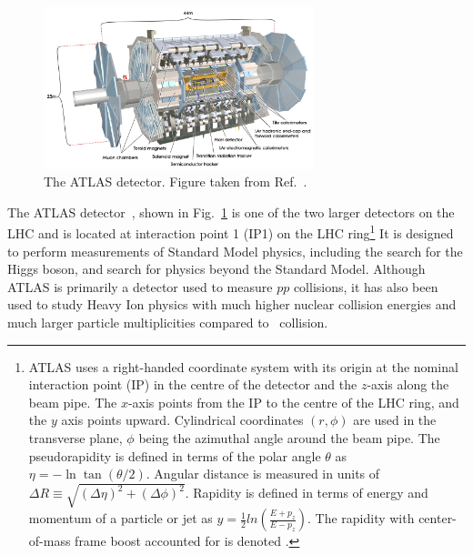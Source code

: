 \begin{figure}[ht]
	\centering
	\includegraphics[width=0.7\textwidth]{figures/atlas.pdf} %
	\caption{The ATLAS detector. Figure taken from Ref.~\cite{Aad:2008zzm}.}	
	\label{fig:atlas}%
\end{figure}

The ATLAS detector~\cite{Aad:2008zzm}, shown in Fig.~\ref{fig:atlas} is one of the two larger detectors on the LHC and is located at interaction point 1 (IP1) on the LHC ring\footnote{
	ATLAS uses a right-handed coordinate system with its origin at the nominal interaction point (IP) in the centre of the detector and the $z$-axis along the beam pipe. The $x$-axis points from the IP to the centre of the LHC ring, and the $y$ axis points upward. Cylindrical coordinates $(r,\phi)$ are used in the transverse plane, $\phi$ being the azimuthal angle around the beam pipe. The pseudorapidity is defined in terms of the polar angle $\theta$ as $\eta=-\ln\tan(\theta/2)$. Angular distance is measured in units of $\Delta R \equiv \sqrt{(\Delta\eta)^{2} + (\Delta\phi)^{2}}$. Rapidity is defined in terms of energy and momentum of a particle or jet as $y=\frac{1}{2}ln(\frac{E+p_{z}}{E-p_{z}})$. The rapidity with center-of-mass frame boost accounted for is denoted \ystar.} 
It is designed to perform measurements of Standard Model physics, including the search for the Higgs boson, and search for physics beyond the Standard Model. Although ATLAS is primarily a detector used to measure $pp$ collisions, it has also been used to study Heavy Ion physics with much higher nuclear collision energies and much larger particle multiplicities compared to \pp\ collision.

